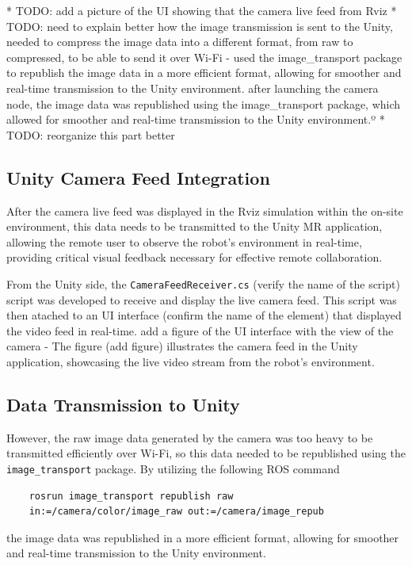 * TODO: add a picture of the UI showing that the camera live feed from Rviz
* TODO: need to explain better how the image transmission is sent to the Unity, needed to compress the image data into a different format, from raw to compressed, to be able to send it over Wi-Fi - used the image_transport package to republish the image data in a more efficient format, allowing for smoother and real-time transmission to the Unity environment.
after launching the camera node, the image data was republished using the image_transport package, which allowed for smoother and real-time transmission to the Unity environment.º
* TODO: reorganize this part better

\subsection{Unity Camera Feed Integration}

After the camera live feed was displayed in the Rviz simulation within the on-site environment, this data needs to be transmitted to the Unity \ac{MR} application, allowing the remote user to observe the robot's environment in real-time, providing critical visual feedback necessary for effective remote collaboration.


From the Unity side, the \texttt{CameraFeedReceiver.cs} (verify the name of the script) script was developed to receive and display the live camera feed. This script was then atached to an UI interface (confirm the name of the element) that displayed the video feed in real-time. 
add a figure of the UI interface with the view of the camera - The figure (add figure) illustrates the camera feed in the Unity application, showcasing the live video stream from the robot's environment.

\subsection{Data Transmission to Unity} 
    
However, the raw image data generated by the camera was too heavy to be transmitted efficiently over Wi-Fi, so this data needed to be republished using the \texttt{image\_transport} package.
By utilizing the following \ac{ROS} command 
\begin{verbatim}
    rosrun image_transport republish raw 
    in:=/camera/color/image_raw out:=/camera/image_repub
\end{verbatim}
the image data was republished in a more efficient format, allowing for smoother and real-time transmission to the Unity environment.


